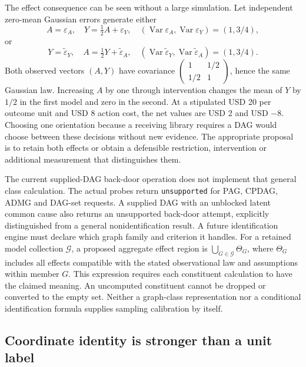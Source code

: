 The effect consequence can be seen without a large simulation. Let independent
zero-mean Gaussian errors generate either
\[
 A=\varepsilon_A,\quad Y=\tfrac12 A+\varepsilon_Y,
 \quad (\operatorname{Var}\varepsilon_A,\operatorname{Var}\varepsilon_Y)
       =(1,3/4),
\]
or
\[
 Y=\widetilde\varepsilon_Y,\quad A=\tfrac12 Y+\widetilde\varepsilon_A,
 \quad (\operatorname{Var}\widetilde\varepsilon_Y,
        \operatorname{Var}\widetilde\varepsilon_A)=(1,3/4).
\]
Both observed vectors \((A,Y)\) have covariance
\(\left(\begin{smallmatrix}1&1/2\\1/2&1\end{smallmatrix}\right)\), hence the
same Gaussian law. Increasing \(A\) by one through intervention changes the
mean of \(Y\) by \(1/2\) in the first model and zero in the second. At a
stipulated USD 20 per outcome unit and USD 8 action cost, the net values are
USD 2 and USD \(-8\). Choosing one orientation because a receiving library
requires a DAG would choose between these decisions without new evidence.
The appropriate proposal is to retain both effects or obtain a defensible
restriction, intervention or additional measurement that distinguishes them.
\citep{exec16_topology_exact}

The current supplied-DAG back-door operation does not implement that general
class calculation. The actual probes return \texttt{unsupported} for PAG,
CPDAG, ADMG and DAG-set requests. A supplied DAG with an unblocked latent
common cause also returns an unsupported back-door attempt, explicitly
distinguished from a general nonidentification result. A future identification
engine must declare which graph family and criterion it handles. For a
retained model collection \(\mathcal G\), a proposed aggregate effect region is
\(\bigcup_{G\in\mathcal G}\Theta_G\), where \(\Theta_G\) includes all effects
compatible with the stated observational law and assumptions within member
\(G\). This expression requires each constituent calculation to have the
claimed meaning. An uncomputed constituent cannot be dropped or converted to
the empty set. Neither a graph-class representation nor a conditional
identification formula supplies sampling calibration by itself.
\citep{exec16_topology_runtime}

\subsection{Coordinate identity is stronger than a unit label}

